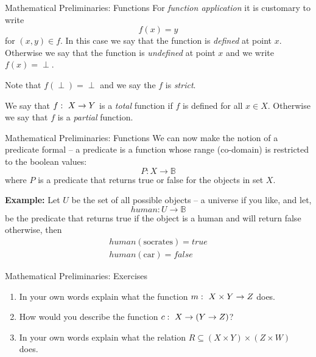 \documentclass{beamer}
\begin{document}
\begin{frame}{\large Mathematical  Preliminaries: Functions}
For {\em function application} it is customary to write
\[
f(x) = y
\]
for $(x,y)\in f$.  In this case we say that the function is {\em defined} at point $x$.
Otherwise we say that the function is {\em undefined} at point $x$ and we write $f(x)=\perp$.

\vspace{.1in}

Note that $f(\perp) = \perp$  and we say the $f$ is {\em strict}.  
\vspace{.1in}

We say that $f\,\colon\; X \rightarrow Y$ is a {\em total} function if $f$ is defined for all $x\in X$.
Otherwise we say that $f$ is a {\em partial} function.
\end{frame}

\begin{frame}{\large Mathematical  Preliminaries: Functions}
We can now make the notion of a predicate formal -- a predicate is a function whose range (co-domain) is restricted to the
boolean values:
\[
P: X \rightarrow {\mathbb B}
\]
where $P$ is a predicate that returns true or false for the objects in set $X$.

\vspace{.1in}

{\bf Example:} Let $U$ be the set of all possible objects -- a universe if you like, and let,
\[
\mathit{human}: U \rightarrow {\mathbb B}
\]
be the predicate that returns true if the object is a human and will return false otherwise, then
\begin{eqnarray*}
\mathit{human}(\mbox{socrates}) = \mathit{true}\\
\mathit{human}(\mbox{car}) = \mathit{false}
\end{eqnarray*}
\end{frame}


\begin{frame}{\large Mathematical  Preliminaries: Exercises}
\begin{enumerate}
\item In your own words explain what the function $m\,\colon\; X\times Y \rightarrow Z$ does.
\item How would you describe the function $c \,\colon\; X \rightarrow (Y \rightarrow Z)$?
\item In your own words explain what the relation $R \subseteq (X\times Y)\times (Z\times W)$ does.
\end{enumerate}
\end{frame}
\end{document}
